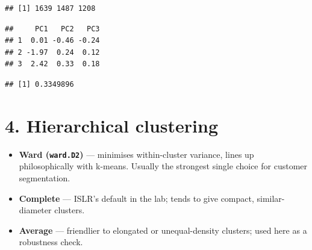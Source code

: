 \documentclass[
]{article}
\newenvironment{Shaded}{\begin{snugshade}}{\end{snugshade}}
\newcommand{\AttributeTok}[1]{\textcolor[rgb]{0.13,0.29,0.53}{#1}}
\newcommand{\CommentTok}[1]{\textcolor[rgb]{0.56,0.35,0.01}{\textit{#1}}}
\newcommand{\DecValTok}[1]{\textcolor[rgb]{0.00,0.00,0.81}{#1}}
\newcommand{\FunctionTok}[1]{\textcolor[rgb]{0.13,0.29,0.53}{\textbf{#1}}}
\newcommand{\NormalTok}[1]{#1}
\newcommand{\OtherTok}[1]{\textcolor[rgb]{0.56,0.35,0.01}{#1}}
\newcommand{\SpecialCharTok}[1]{\textcolor[rgb]{0.81,0.36,0.00}{\textbf{#1}}}
\newcommand{\StringTok}[1]{\textcolor[rgb]{0.31,0.60,0.02}{#1}}
\providecommand{\tightlist}{%
  \setlength{\itemsep}{0pt}\setlength{\parskip}{0pt}}
\begin{document}
\begin{Shaded}
\end{Shaded}

\begin{verbatim}
## [1] 1639 1487 1208
\end{verbatim}

\begin{Shaded}
\end{Shaded}

\begin{verbatim}
##     PC1   PC2   PC3
## 1  0.01 -0.46 -0.24
## 2 -1.97  0.24  0.12
## 3  2.42  0.33  0.18
\end{verbatim}

\begin{Shaded}
\end{Shaded}

\begin{verbatim}
## [1] 0.3349896
\end{verbatim}

\section{4. Hierarchical clustering}\label{hierarchical-clustering}

\begin{itemize}
\tightlist
\item
  \textbf{Ward (\texttt{ward.D2})} --- minimises within-cluster
  variance, lines up philosophically with k-means. Usually the strongest
  single choice for customer segmentation.
\item
  \textbf{Complete} --- ISLR's default in the lab; tends to give
  compact, similar-diameter clusters.
\item
  \textbf{Average} --- friendlier to elongated or unequal-density
  clusters; used here as a robustness check.
\end{itemize}
\end{document}
